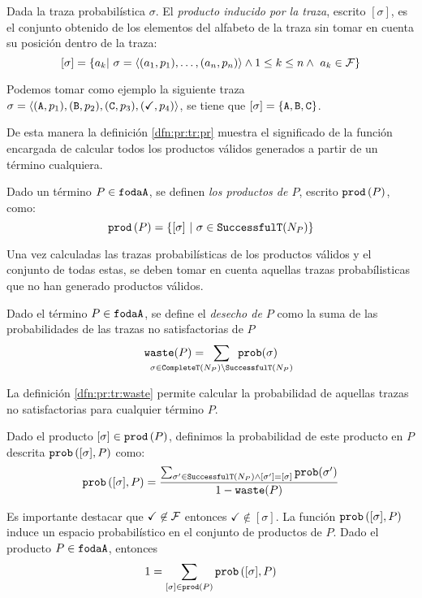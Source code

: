  \bdfn\label{dfn:pr:tr:cn}
 Dada la traza probabilística $\sigma$. El \emph{producto inducido por la traza},
 escrito $[\sigma]$, es el conjunto obtenido
 de los elementos del alfabeto de la traza sin tomar en cuenta su posición dentro de la
 traza: 
 $$
 [\sigma] = \{ a_k |\ \sigma=\langle (a_{1},p_{1}),\ldots ,(a_{n},p_{n})\rangle \land 1 \leq k \leq n \land\ a_k\in\calF\}
 $$
 \edfn
 
Podemos tomar como ejemplo la siguiente traza $\sigma=\langle(\mathtt{A},p_{1}),(\mathtt{B},p_{2}),(\mathtt{C},p_{3}),(\checkmark,p_{4})\rangle$, 
 se tiene que
  $[\sigma]=\{\mathtt{A}, \mathtt{B}, \mathtt{C}\}$.

De esta manera la definición \ref{dfn:pr:tr:pr}
muestra 
el significado de la función 
encargada de calcular todos
los productos válidos generados
a partir
de un término cualquiera.

 \bdfn\label{dfn:pr:tr:pr}
 Dado un término $P\in\mathtt{fodaA}$, se definen \emph{los productos de $P$}, escrito
 $\mathtt{prod}\left(P\right)$, como:
 $$\products{P}=\{[\sigma]\ | \ \sigma\in\straces{N_P}\}$$
 \edfn
 
 Una vez calculadas las trazas probabilísticas de 
 los productos válidos y el conjunto de todas estas,
 se deben tomar en cuenta aquellas trazas probabílisticas
 que no han generado productos válidos.
 
 
 \bdfn\label{dfn:pr:tr:waste}
 Dado el término $P\in\mathtt{fodaA}$, se define el \emph{desecho de $P$} como
 la suma de las probabilidades de las trazas no satisfactorias de $P$
 $$\waste{P}= \hspace*{-5em}\sum_{\sigma\in\ctraces{N_P}\setminus\straces{N_P}}\hspace*{-5em}\completeprob{\sigma}$$
 \edfn

La definición \ref{dfn:pr:tr:waste} permite calcular la probabilidad de aquellas trazas
no satisfactorias para cualquier término $P$.

 \bdfn
   Dado el producto $[\sigma]\in\mathtt{prod}\left(P\right)$, 
   definimos la probabilidad de este producto en $P$ descrita $\mathtt{prob}\left([\sigma],P\right)$ como:
         $$
         \mathtt{prob}\left([\sigma],P\right) = \frac{\sum_{ \sigma' \in \mathtt{SuccessfulT}(N_P) \land  [\sigma'] =  [\sigma]} \texttt{prob}(\sigma')}{1-\mathtt{waste}(P)}$$
 \edfn


 Es importante destacar que $\checkmark\not\in{\cal F}$ entonces $\checkmark\not\in [\sigma]$.
 La función $\mathtt{prob}\left([\sigma],P\right)$ induce un espacio probabilístico en el conjunto
 de productos de $P$.
 \bprop\label{dfn:pr:sum}
   Dado el producto $P\in\mathtt{fodaA}$, entonces
   $$1 = \sum_{[\sigma]\in\mathtt{prod}\left(P\right)} \mathtt{prob}\left([\sigma],P\right)$$
 \eprop

